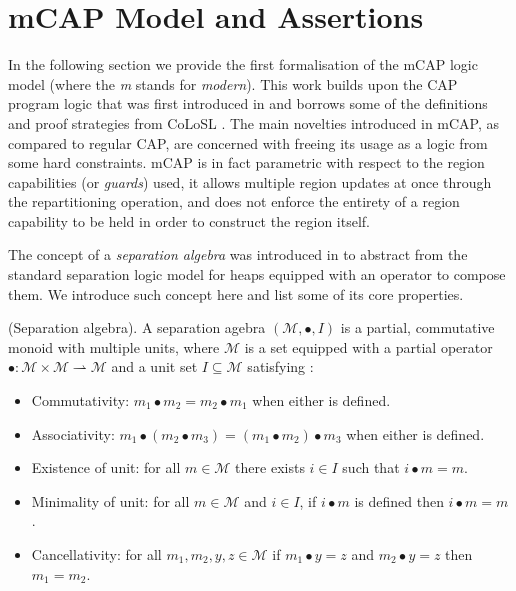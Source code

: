 \section{mCAP Model and Assertions}

In the following section we provide the first formalisation of the mCAP logic model (where the \textit{m} stands for \textit{modern}). This work builds upon the CAP program logic that was first introduced in \cite{cap} and borrows some of the definitions and proof strategies from CoLoSL \cite{colosl}. The main novelties introduced in mCAP, as compared to regular CAP, are concerned with freeing its usage as a logic from some hard constraints. mCAP is in fact parametric with respect to the region capabilities (or \textit{guards}) used, it allows multiple region updates at once through the repartitioning operation, and does not enforce the entirety of a region capability to be held in order to construct the region itself.



The concept of a \textit{separation algebra} was introduced in \cite{sepalgebra} to abstract from the standard separation logic model for heaps equipped with an operator to compose them. We introduce such concept here and list some of its core properties.

 (Separation algebra). A separation agebra $(\mathcal{M}, \bullet, I)$ is a partial, commutative monoid with multiple units, where $\mathcal{M}$ is a set equipped with a partial operator $\bullet : \mathcal{M} \times \mathcal{M} \rightharpoonup \mathcal{M}$ and a unit set $I \subseteq \mathcal{M}$ satisfying \cite{views}:
\begin{itemize}
\item Commutativity: $m_1 \bullet m_2 = m_2 \bullet m_1$ when either is defined.
\item Associativity: $m_1 \bullet (m_2 \bullet m_3) = (m_1 \bullet m_2) \bullet m_3$ when either is defined.
\item Existence of unit: for all $m \in \mathcal{M}$ there exists $i \in I$ such that $i \bullet m = m$.
\item Minimality of unit: for all $m \in \mathcal{M}$ and $i \in I$, if $i \bullet m$ is defined then $i \bullet m = m$.
\item Cancellativity: for all $m_1, m_2, y, z \in \mathcal{M}$ if $m_1 \bullet y = z$ and $m_2 \bullet y = z$ then $m_1 = m_2$.
\end{itemize}

